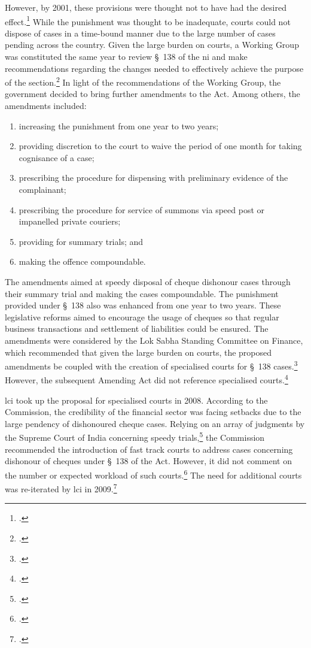 However, by 2001, these provisions were thought not to have had the desired effect.\footcite{stdcomm2001_138niAct} While the punishment was thought to be inadequate, courts could not dispose of cases in a time-bound manner due to the large number of cases pending across the country. Given the large burden on courts, a Working Group was constituted the same year to review \S~138 of the \gls{ni} and make recommendations regarding the changes needed to effectively achieve the purpose of the section.\footcite{wg2001_138} In light of the recommendations of the Working Group, the government decided to bring further amendments to the Act. Among others, the amendments included:

\begin{enumerate}[label=(\alph*)]
 \item increasing the punishment from one year to two years;
 \item providing discretion to the court to waive the period of one month for taking cognisance of a case;
 \item prescribing the procedure for dispensing with preliminary evidence of the complainant;
 \item prescribing the procedure for service of summons via speed post or impanelled private couriers;
 \item providing for summary trials; and
 \item making the offence compoundable.
\end{enumerate}

The amendments aimed at speedy disposal of cheque dishonour cases through their summary trial and making the cases compoundable. The punishment provided under \S~138 also was enhanced from one year to two years. These legislative
reforms aimed to encourage the usage of cheques so that regular business transactions and settlement of liabilities could be ensured. The amendments were considered by the Lok Sabha Standing Committee on Finance, which recommended that given the large burden on courts, the proposed amendments be coupled with the creation of specialised courts for \S~138 cases.\footcite{stdcomm2001_138niAct} However, the subsequent Amending Act did not reference specialised courts.\footcite{niAmend2002} 

\gls{lci} took up the proposal for specialised courts in 2008. According to the Commission, the credibility of the financial sector was facing setbacks due to the large pendency of dishonoured cheque cases. Relying on an array of judgments by the Supreme Court of India concerning speedy trials,\footcite{sc1978_khatoon, sc1981_champalal, sc2005_surinder, sc2008_krishna} the Commission recommended the introduction of fast track courts to address cases concerning dishonour of cheques under \S~138 of the Act. However, it did not comment on the number or expected workload of such courts.\footcite{lci2008_138} The need for additional courts was re-iterated by \gls{lci} in 2009.\footcite{lci2009_reforms}

